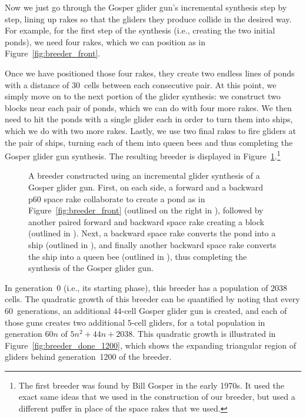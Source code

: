 Now we just go through the Gosper glider gun's incremental synthesis step by step, lining up rakes so that the gliders they produce collide in the desired way. For example, for the first step of the synthesis (i.e., creating the two initial ponds), we need four rakes, which we can position as in Figure~\ref{fig:breeder_front}.

Once we have positioned those four rakes, they create two endless lines of ponds with a distance of 30~cells between each consecutive pair. At this point, we simply move on to the next portion of the glider synthesis: we construct two blocks near each pair of ponds, which we can do with four more rakes. We then need to hit the ponds with a single glider each in order to turn them into ships, which we do with two more rakes. Lastly, we use two final rakes to fire gliders at the pair of ships, turning each of them into queen bees and thus completing the Gosper glider gun synthesis. The resulting breeder is displayed in Figure~\ref{fig:breeder_done}.\footnote{The first breeder was found by Bill Gosper in the early 1970s. It used the exact same ideas that we used in the construction of our breeder, but used a different puffer in place of the space rakes that we used.}

\begin{figure}[!ht]
	\centering
	\caption{A breeder constructed using an incremental glider synthesis of a Gosper glider gun. First, on each side, a forward and a backward p60 space rake collaborate to create a pond as in Figure~\ref{fig:breeder_front} (outlined on the right in ), followed by another paired forward and backward space rake creating a block (outlined in ). Next, a backward space rake converts the pond into a ship (outlined in ), and finally another backward space rake converts the ship into a queen bee (outlined in ), thus completing the synthesis of the Gosper glider gun.}\label{fig:breeder_done}
\end{figure}

In generation~0 (i.e., its starting phase), this breeder has a population of $2038$ cells. The quadratic growth of this breeder can be quantified by noting that every 60~generations, an additional $44$-cell Gosper glider gun is created, and each of those guns creates two additional $5$-cell gliders, for a total population in generation $60n$ of $5n^2 + 44n + 2038$. This quadratic growth is illustrated in Figure~\ref{fig:breeder_done_1200}, which shows the expanding triangular region of gliders behind generation~1200 of the breeder.

